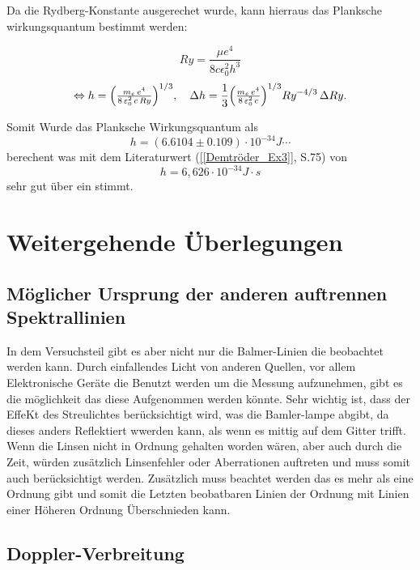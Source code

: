 Da die Rydberg-Konstante ausgerechet wurde, kann hierraus das Planksche wirkungsquantum bestimmt werden:

\begin{equation}
    Ry = \frac{\mu e^4}{8 c \epsilon_0^2h^3}
\end{equation}
\begin{equation}
  \Leftrightarrow h
  = \Bigl(\tfrac{m_e\,e^{4}}{8\,\varepsilon_{0}^{2}\,c\,Ry}\Bigr)^{1/3},
  \quad
  \Delta h
  = \frac{1}{3}
    \Bigl(\tfrac{m_e\,e^{4}}{8\,\varepsilon_{0}^{2}\,c}\Bigr)^{1/3}
    Ry^{-4/3}\,\Delta Ry.
\end{equation}

Somit Wurde das Planksche Wirkungsquantum als
\begin{equation}
    h = (6.6104 \pm 0.109)\cdot 10^{-34} J\cdots
\end{equation}
berechent was mit dem Literaturwert (\cref{[Demtröder_Ex3]}, S.75) von
\begin{equation}
    h = 6,626 \cdot10^{-34} J\cdot s
\end{equation}
sehr gut über ein stimmt.


\section{Weitergehende Überlegungen}
\subsection{Möglicher Ursprung der anderen auftrennen Spektrallinien}
In dem Versuchsteil gibt es aber nicht nur die Balmer-Linien die beobachtet werden kann. 
Durch einfallendes Licht von anderen Quellen, vor allem Elektronische Geräte die Benutzt werden um die Messung aufzunehmen, gibt es die möglichkeit das diese Aufgenommen werden könnte.
Sehr wichtig ist, dass der EffeKt des Streulichtes berücksichtigt wird, was die Bamler-lampe abgibt, da dieses anders Reflektiert wwerden kann, als wenn es mittig auf dem Gitter trifft.
Wenn die Linsen nicht in Ordnung gehalten worden wären, aber auch durch die Zeit, würden zusätzlich Linsenfehler oder Aberrationen auftreten und muss somit auch berücksichtigt werden. 
Zusätzlich muss beachtet werden das es mehr als eine Ordnung gibt und somit die Letzten beobatbaren Linien der Ordnung mit Linien einer Höheren Ordnung Überschnieden kann.

\subsection{Doppler-Verbreitung}

